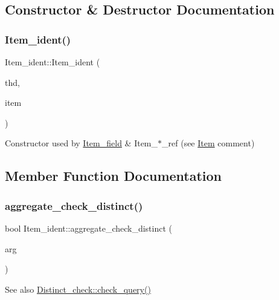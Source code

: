 \subsection{Constructor \& Destructor Documentation}
\mbox{\label{classItem__ident_a1ad10c05cb6971dd58d4b3082bc31f06}} 
\subsubsection{\texorpdfstring{Item\+\_\+ident()}{Item\_ident()}}
{\footnotesize\ttfamily Item\+\_\+ident\+::\+Item\+\_\+ident (\begin{DoxyParamCaption}\item[{T\+HD $\ast$}]{thd,  }\item[{\mbox{\hyperlink{classItem__ident}{Item\+\_\+ident}} $\ast$}]{item }\end{DoxyParamCaption})}

Constructor used by \mbox{\hyperlink{classItem__field}{Item\+\_\+field}} \& Item\+\_\+$\ast$\+\_\+ref (see \mbox{\hyperlink{classItem}{Item}} comment) 

\subsection{Member Function Documentation}
\mbox{\label{classItem__ident_a00ab5f763e017d4892db3d07fc8b13f3}} 
\subsubsection{\texorpdfstring{aggregate\+\_\+check\+\_\+distinct()}{aggregate\_check\_distinct()}}
{\footnotesize\ttfamily bool Item\+\_\+ident\+::aggregate\+\_\+check\+\_\+distinct (\begin{DoxyParamCaption}\item[{uchar $\ast$}]{arg }\end{DoxyParamCaption})\hspace{0.3cm}{\ttfamily [virtual]}}

\begin{DoxySeeAlso}{See also}
\mbox{\hyperlink{group__AGGREGATE__CHECKS_ga83e75b415b78e10ade375ad320ea446c}{Distinct\+\_\+check\+::check\+\_\+query()}} 
\end{DoxySeeAlso}


